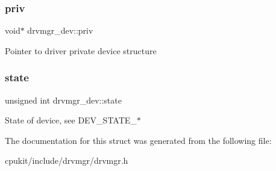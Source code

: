 \subsubsection{\texorpdfstring{priv}{priv}}
{\footnotesize\ttfamily void$\ast$ drvmgr\+\_\+dev\+::priv}

Pointer to driver private device structure \mbox{\label{structdrvmgr__dev_a6cf0b5c5f009ba47cf18fa567eb9218d}} 
\subsubsection{\texorpdfstring{state}{state}}
{\footnotesize\ttfamily unsigned int drvmgr\+\_\+dev\+::state}

State of device, see D\+E\+V\+\_\+\+S\+T\+A\+T\+E\+\_\+$\ast$ 

The documentation for this struct was generated from the following file\+:\begin{DoxyCompactItemize}
\item 
cpukit/include/drvmgr/drvmgr.\+h\end{DoxyCompactItemize}
